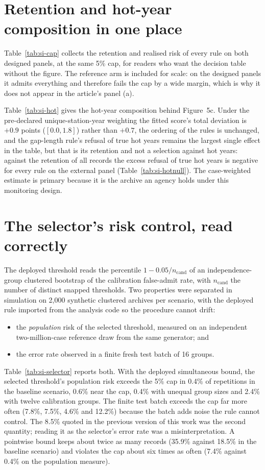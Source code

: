 \documentclass[draft]{agujournal2025}
\begin{document}
\section{Retention and hot-year composition in one place}

Table~\ref{tab:si-cap} collects the retention and realised risk of every rule on
both designed panels, at the same 5\% cap, for readers who want the decision
table without the figure. The reference arm is included for scale: on the
designed panels it admits everything and therefore fails the cap by a wide
margin, which is why it does not appear in the article's panel (a).

Table~\ref{tab:si-hot} gives the hot-year composition behind Figure~5c. Under
the pre-declared unique-station-year weighting the fitted score's total
deviation is $+0.9$ points ($[0.0,1.8]$) rather than $+0.7$, the ordering of the
rules is unchanged, and the gap-length rule's refusal of true hot years remains
the largest single effect in the table, but that is its retention and not a
selection against hot years: against the retention of all records the excess
refusal of true hot years is negative for every rule on the external panel
(Table~\ref{tab:si-hotnull}). The case-weighted estimate is primary because it is
the archive an agency holds under this monitoring design.

\section{The selector's risk control, read correctly}

The deployed threshold reads the percentile $1-0.05/n_{\mathrm{cand}}$ of an
independence-group clustered bootstrap of the calibration false-admit rate, with
$n_{\mathrm{cand}}$ the number of distinct snapped thresholds. Two properties
were separated in simulation on 2{,}000 synthetic clustered archives per
scenario, with the deployed rule imported from the analysis code so the procedure
cannot drift:
\begin{itemize}
\item the \emph{population} risk of the selected threshold, measured on an
independent two-million-case reference draw from the same generator; and
\item the error rate observed in a finite fresh test batch of 16 groups.
\end{itemize}
Table~\ref{tab:si-selector} reports both. With the deployed simultaneous bound,
the selected threshold's population risk exceeds the 5\% cap in 0.4\% of
repetitions in the baseline scenario, 0.6\% near the cap, 0.4\% with unequal
group sizes and 2.4\% with twelve calibration groups. The finite test batch
exceeds the cap far more often (7.8\%, 7.5\%, 4.6\% and 12.2\%) because the batch
adds noise the rule cannot control. The 8.5\% quoted in the previous version of
this work was the second quantity; reading it as the selector's error rate was a
misinterpretation. A pointwise bound keeps about twice as many records (35.9\%
against 18.5\% in the baseline scenario) and violates the cap about six times as
often (7.4\% against 0.4\% on the population measure).
\end{document}

